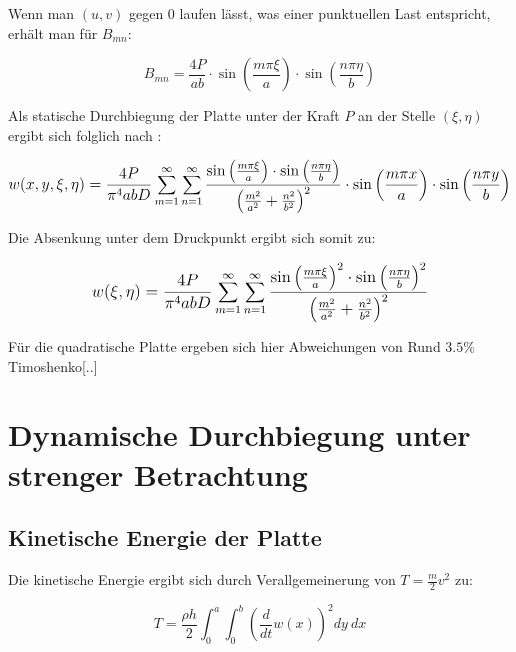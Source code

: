 Wenn man $(u,v)$ gegen $0$ laufen lässt, was einer punktuellen Last entspricht, erhält man für $B_{mn}$:

\begin{equation}
B_{mn} = \dfrac{4P}{a b} 
\cdot \sin\left(\dfrac{m \pi \xi}{a}\right) 
\cdot \sin\left(\dfrac{n \pi \eta}{b}\right) 
\end{equation}

Als statische Durchbiegung der Platte unter der Kraft $P$ an der Stelle $(\xi, \eta)$ ergibt sich folglich nach :
 
\begin{equation}
 \mathlarger{
 	w(x,y,\xi,\eta) = \frac{4P}{\pi^4 a b D} 
 	\sum_{m = 1}^{\infty} \sum_{n = 1}^{\infty}
 	\dfrac{
 		\sin\left(\frac{m \pi \xi}{a}\right) 
 		\cdot \sin\left(\frac{n \pi \eta}{b}\right) 
 	}{
 		\left( 
 		\frac{m^2}{a^2} +
 		\frac{n^2}{b^2}
 		\right)^2
 	}
 	\cdot \sin\left(\frac{m \pi x}{a}\right) 
 	\cdot \sin\left(\frac{n \pi y}{b}\right) 
 }
 \end{equation}

Die Absenkung unter dem Druckpunkt ergibt sich somit zu:

\begin{equation}
 \mathlarger{
	w(\xi,\eta) = \frac{4P}{\pi^4 a b D} 
	\sum_{m = 1}^{\infty} \sum_{n = 1}^{\infty}
	\dfrac{
		\sin\left(\frac{m \pi \xi}{a}\right)^2 
		\cdot 	\sin\left(\frac{n \pi \eta}{b}\right) ^2
	}{
		\left( 
		\frac{m^2}{a^2} +
		\frac{n^2}{b^2}
		\right)^2
	}
}
\end{equation}


Für die quadratische Platte ergeben sich hier Abweichungen von Rund $3.5\%$ Timoshenko[..]


\section{Dynamische Durchbiegung unter strenger Betrachtung}

\subsection{Kinetische Energie der Platte}

Die kinetische Energie ergibt sich durch Verallgemeinerung von $T = \frac{m}{2} v^2$ zu:

\begin{equation}
T = \dfrac{\rho h}{2} \int_{0}^{a} \int_{0}^{b} \left(\dfrac{d}{dt} w(x)\right)^2 dy \ dx
\end{equation}

